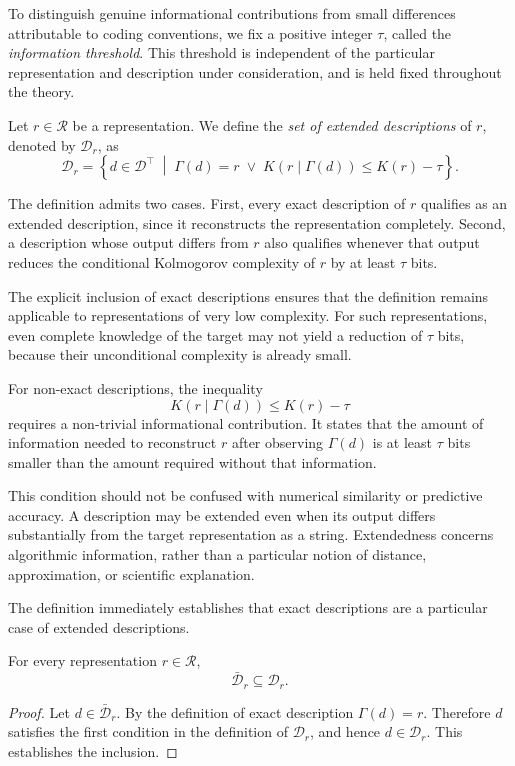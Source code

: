 To distinguish genuine informational contributions from small differences attributable to coding conventions, we fix a positive integer $\tau$, called the \emph{information threshold}. This threshold is independent of the particular representation and description under consideration, and is held fixed throughout the theory.

\begin{definition}
\label{def:extended_descriptions_for_representation}
Let $r\in\mathcal{R}$ be a representation. We define the \emph{set of extended descriptions} of $r$, denoted by $\mathcal{D}_r$, as
\[
\mathcal{D}_r = \left\{d\in\mathcal{D}^\top \;\middle|\; \Gamma(d)=r \;\lor\;
K(r\mid\Gamma(d))\leq K(r)-\tau \right\}.
\]
\end{definition}

The definition admits two cases. First, every exact description of $r$ qualifies as an extended description, since it reconstructs the representation completely. Second, a description whose output differs from $r$ also qualifies whenever that output reduces the conditional Kolmogorov complexity of $r$ by at least $\tau$ bits.

The explicit inclusion of exact descriptions ensures that the definition remains applicable to representations of very low complexity. For such representations, even complete knowledge of the target may not yield a reduction of $\tau$ bits, because their unconditional complexity is already small.

For non-exact descriptions, the inequality
\[
K(r\mid\Gamma(d))\leq K(r)-\tau
\]
requires a non-trivial informational contribution. It states that the amount of information needed to reconstruct $r$ after observing $\Gamma(d)$ is at least $\tau$ bits smaller than the amount required without that information.

This condition should not be confused with numerical similarity or predictive accuracy. A description may be extended even when its output differs substantially from the target representation as a string. Extendedness concerns algorithmic information, rather than a particular notion of distance, approximation, or scientific explanation.

The definition immediately establishes that exact descriptions are a particular case of extended descriptions.

\begin{proposition}
\label{prop:exact_descriptions_are_extended}
For every representation $r\in\mathcal{R}$,
\[
\bar{\mathcal{D}}_r\subseteq\mathcal{D}_r.
\]
\end{proposition}
\begin{proof}
Let $d\in\bar{\mathcal{D}}_r$. By the definition of exact description $\Gamma(d)=r$. Therefore $d$ satisfies the first condition in the definition of $\mathcal{D}_r$, and hence $d\in\mathcal{D}_r$. This establishes the inclusion.
\end{proof}

